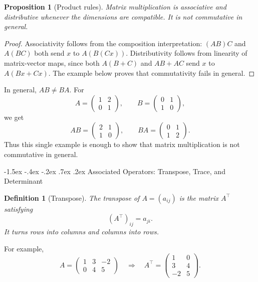 \documentclass[10pt]{article}
\makeatletter
\renewcommand\section{\@startsection{section}{1}{\z@}%
  {-1.5ex \@plus -.4ex \@minus -.2ex}%
  {.7ex \@plus .2ex}%
  {\normalfont\large\bfseries}}
\theoremstyle{compactdefinition}
\newtheorem{definition}{Definition}[section]
\theoremstyle{compactproposition}
\newtheorem{proposition}{Proposition}[section]
\makeatother
\begin{document}
\begin{proposition}[Product rules]
Matrix multiplication is associative and distributive whenever the dimensions
are compatible. It is not commutative in general.
\end{proposition}

\begin{proof}
Associativity follows from the composition interpretation:
$(AB)C$ and $A(BC)$ both send $x$ to $A(B(Cx))$. Distributivity follows from
linearity of matrix-vector maps, since both $A(B+C)$ and $AB+AC$ send $x$ to
$A(Bx+Cx)$. The example below proves that commutativity fails in general.
\end{proof}

In general, $AB\neq BA$. For
\[
A=\begin{pmatrix}1&2\\0&1\end{pmatrix},
\qquad
B=\begin{pmatrix}0&1\\1&0\end{pmatrix},
\]
we get
\[
AB=\begin{pmatrix}2&1\\1&0\end{pmatrix},
\qquad
BA=\begin{pmatrix}0&1\\1&2\end{pmatrix}.
\]
Thus this single example is enough to show that matrix multiplication is not
commutative in general.

\section{Associated Operators: Transpose, Trace, and Determinant}

\begin{definition}[Transpose]
The transpose of $A=(a_{ij})$ is the matrix $A^\top$ satisfying
\[
(A^\top)_{ij}=a_{ji}.
\]
It turns rows into columns and columns into rows.
\end{definition}

For example,
\[
A=
\begin{pmatrix}
1&3&-2\\
0&4&5
\end{pmatrix}
\quad\Longrightarrow\quad
A^\top=
\begin{pmatrix}
1&0\\
3&4\\
-2&5
\end{pmatrix}.
\]
\end{document}
